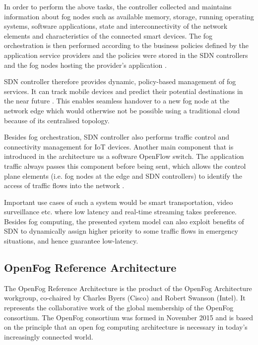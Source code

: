 \documentclass{article}
\begin{document}
In order to perform the above tasks, the controller collected and maintains information about fog nodes such as available memory, storage, running operating systems, software applications, state and interconnectivity of the network elements and characteristics of the connected smart devices.
The fog orchestration is then performed according to the business policies defined by the application service providers and the policies were stored in the SDN controllers and the fog nodes hosting the provider's application \cite{tomovic2017software}.

SDN controller therefore provides dynamic, policy-based management of fog services. It can track mobile devices and predict their potential destinations in the near future \cite{tomovic2017software}. This enables seamless handover to a new fog node at the network edge which would otherwise not be possible using a traditional cloud because of its centralised topology.

Besides fog orchestration, SDN controller also performs traffic control and connectivity management for IoT devices.
Another main component that is introduced in the architecture us a software OpenFlow switch. 
The application traffic always passes this component before being sent, which allows the control plane elements (i.e. fog nodes at the edge and SDN controllers) to identify the access of traffic flows into the network \cite{tomovic2017software}. 

Important use cases of such a system would be smart transportation, video surveillance etc. where low latency and real-time streaming takes preference. Besides fog computing, the presented system model can also exploit benefits of SDN to dynamically assign higher priority to some traffic flows in emergency situations, and hence guarantee low-latency.

\subsection{OpenFog Reference Architecture}

The OpenFog Reference Architecture is the product of the OpenFog Architecture workgroup, co-chaired by Charles Byers (Cisco) and Robert Swanson (Intel)\cite{openfogconsortium2017}. 
It represents the collaborative work of the global membership of the OpenFog consortium\cite{openfogconsortium2017}. 
The OpenFog consortium was formed in November 2015 and is based on the principle that an open fog computing architecture is necessary in today’s increasingly connected world\cite{openfogconsortium2017}.
\end{document}
